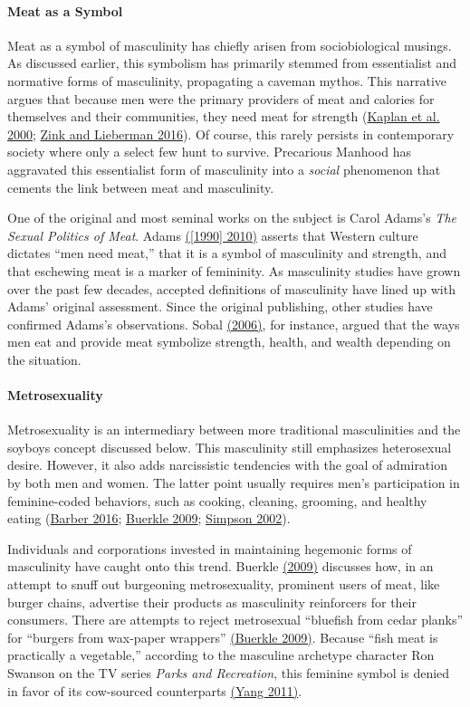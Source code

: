 \documentclass[twoside]{report}
\begin{document}
\begin{multicols}{2}
\paragraph{Meat as a Symbol}

Meat as a symbol of masculinity has chiefly arisen from sociobiological
musings. As discussed earlier, this symbolism has primarily stemmed from essentialist and normative forms of masculinity, propagating a caveman mythos. This narrative argues that because men were the primary providers of meat and calories for themselves and their communities, they need meat for strength (\hyperlink{kaplan}{Kaplan et al. 2000}; \hyperlink{zink}{Zink and Lieberman 2016}). Of course, this rarely persists in contemporary society where only a select few hunt to survive. Precarious Manhood has aggravated this essentialist form of masculinity into a \textit{social} phenomenon that cements the link between meat and masculinity.

One of the original and most seminal works on the subject is Carol Adams's \emph{The Sexual Politics of Meat}. Adams \hyperlink{adams}{([1990] 2010)} asserts that Western culture dictates ``men need meat,'' that it is a symbol of masculinity and strength, and that eschewing meat is a marker of femininity. As masculinity studies have grown over the past few decades, accepted definitions of masculinity have lined up with Adams' original assessment. Since the original publishing, other studies have confirmed Adams's observations. Sobal \hyperlink{sobal}{(2006)}, for instance, argued that the ways men eat and provide meat symbolize strength, health, and wealth depending on the situation.

\paragraph{Metrosexuality}
Metrosexuality is an intermediary between more traditional masculinities
and the soyboys concept discussed below. This masculinity still
emphasizes heterosexual desire. However, it also adds narcissistic
tendencies with the goal of admiration by both men and women. The latter
point usually requires men's participation in feminine-coded behaviors,
such as cooking, cleaning, grooming, and healthy eating (\hyperlink{barber1}{Barber 2016}; \hyperlink{buerkle}{Buerkle 2009}; \hyperlink{simpson}{Simpson 2002}).


Individuals and corporations invested in maintaining hegemonic forms of
masculinity have caught onto this trend. Buerkle \hyperlink{buerkle}{(2009)} discusses how, in an attempt to snuff out burgeoning metrosexuality, prominent users of meat, like burger chains, advertise their products as masculinity
reinforcers for their consumers. There are attempts to reject
metrosexual ``bluefish from cedar planks'' for ``burgers from wax-paper
wrappers'' \hyperlink{buerkle}{(Buerkle 2009)}. Because ``fish meat is practically a vegetable,'' according to the masculine archetype character Ron Swanson on the TV series \emph{Parks and Recreation}, this feminine symbol is denied in favor of
its cow-sourced counterparts \hyperlink{yang}{(Yang 2011)}.


\end{multicols}
\end{document}
